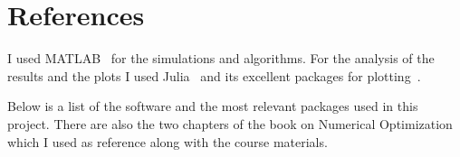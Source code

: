 \pagebreak
\appendix
\section{References}

I used MATLAB~\cite{noauthor_matlab_2022} for the simulations and algorithms.
For the analysis of the
results and the plots I used Julia~\cite{bezanson_julia_2017}
and its excellent packages for plotting~\cite{breloff_plotsjl_2022,plas_fonspplutojl_2022,carlsson_pgfplotsxjl_2022}.

Below is a list of the software and the most relevant packages used in this
project. There are also the two chapters of the book on Numerical Optimization~\cite{nocedal_line_2006,nocedal_quasi-newton_2006} which I
used as reference along with the course materials.
\printbibliography[heading=none]

\pagebreak
\listoffigures \listoftables




